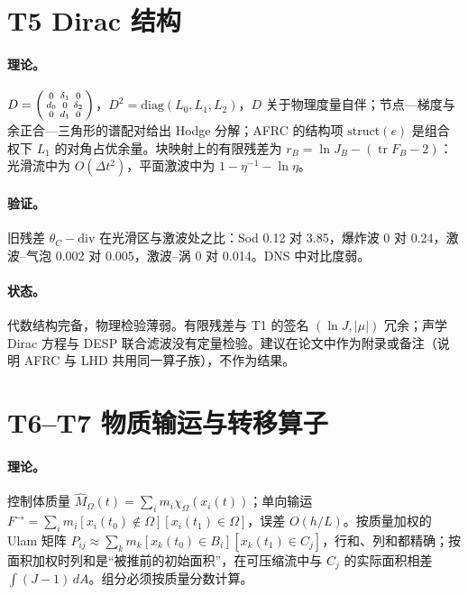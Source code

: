 \section{T5 Dirac 结构}

\paragraph{理论。}$D=\begin{psmallmatrix}0&\delta_1&0\\d_0&0&\delta_2\\0&d_1&0\end{psmallmatrix}$，$D^2=\mathrm{diag}(L_0,L_1,L_2)$，$D$ 关于物理度量自伴；节点—梯度与余正合—三角形的谱配对给出 Hodge 分解；AFRC 的结构项 $\mathrm{struct}(e)$ 是组合权下 $L_1$ 的对角占优余量。块映射上的有限残差为 $r_B=\ln J_B-(\operatorname{tr}F_B-2)$：光滑流中为 $O(\Delta t^2)$，平面激波中为 $1-\eta^{-1}-\ln\eta$。

\paragraph{验证。}旧残差 $\theta_C-\mathrm{div}$ 在光滑区与激波处之比：Sod 0.12 对 3.85，爆炸波 0 对 0.24，激波–气泡 0.002 对 0.005，激波–涡 0 对 0.014。DNS 中对比度弱。

\paragraph{状态。}代数结构完备，物理检验薄弱。有限残差与 T1 的签名 $(\ln J,|\mu|)$ 冗余；声学 Dirac 方程与 DESP 联合滤波没有定量检验。建议在论文中作为附录或备注（说明 AFRC 与 LHD 共用同一算子族），不作为结果。

\section{T6–T7 物质输运与转移算子}

\paragraph{理论。}控制体质量 $\hat M_\Omega(t)=\sum_im_i\chi_\Omega(x_i(t))$；单向输运 $F^\to=\sum_im_i[x_i(t_0)\notin\Omega][x_i(t_1)\in\Omega]$，误差 $O(h/L)$。按质量加权的 Ulam 矩阵 $P_{ij}\approx\sum_km_k[x_k(t_0)\in B_i][x_k(t_1)\in C_j]$，行和、列和都精确；按面积加权时列和是“被推前的初始面积”，在可压缩流中与 $C_j$ 的实际面积相差 $\int(J-1)\,dA$。组分必须按质量分数计算。

